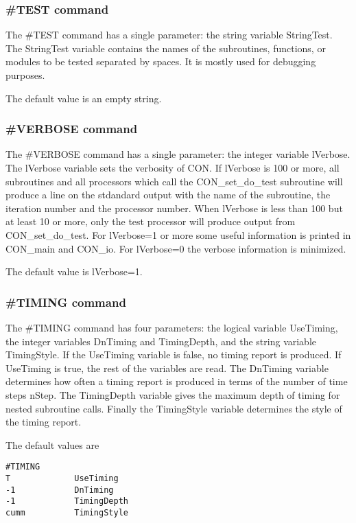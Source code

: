 \subsubsection{\#TEST command}

The \#TEST command has a single parameter: the string variable StringTest.
The StringTest variable contains the names of the subroutines, functions,
or modules to be tested separated by spaces. 
It is mostly used for debugging purposes.

The default value is an empty string.

\subsubsection{\#VERBOSE command}

The \#VERBOSE command has a single parameter: the integer variable lVerbose.
The lVerbose variable sets the verbosity of CON. If lVerbose is 100 or more,
all subroutines and all processors which call the 
CON\_set\_do\_test subroutine will produce a line on the stdandard output
with the name of the subroutine, the iteration number and the
processor number. When lVerbose is less than 100 but at least 10 or more,
only the test processor will produce output from CON\_set\_do\_test.
For lVerbose=1 or more some useful information is printed in CON\_main and 
CON\_io. For lVerbose=0 the verbose information is minimized.

The default value is lVerbose=1.

\subsubsection{\#TIMING command}

The \#TIMING command has four parameters: the logical variable UseTiming,
the integer variables DnTiming and TimingDepth, and the string variable
TimingStyle. If the UseTiming variable is false, no timing report is 
produced. If UseTiming is true, the rest of the variables are read.
The DnTiming variable determines how often a timing report is produced
in terms of the number of time steps nStep. The TimingDepth variable
gives the maximum depth of timing for nested subroutine calls.
Finally the TimingStyle variable determines the style of the timing
report.

The default values are
\begin{verbatim}
#TIMING
T             UseTiming
-1            DnTiming
-1            TimingDepth
cumm          TimingStyle
\end{verbatim}

